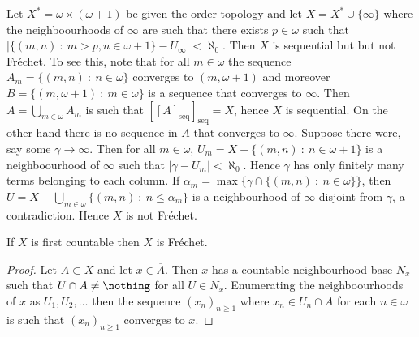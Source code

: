 \documentclass{article}
\newcommand{\seqcl}[1]{{[#1]_{\text{seq}}}}
\begin{document}
 
\begin{exam}
    Let \(X^{\ast} = \omega \times (\omega + 1)\) be given the order topology and let \(X =  X^{\ast} \cup \{\infty\}\) where the neighboourhoods  of \(\infty\) are such that there exists \(p \in \omega\) such that \(|\{(m, n) \: : \: m > p, n \in \omega + 1\} - U_{\infty}| < \aleph_0\). Then \(X\) is sequential but but not Fréchet. To see this, note that for all \(m \in \omega\) the sequence \(A_m = \{(m, n) \: : \: n \in \omega\}\) converges to \((m, \omega + 1)\) and moreover \(B = \{(m, \omega + 1) \: : \: m \in \omega\}\) is a sequence that converges to \(\infty\). Then \(A = \bigcup_{m \in \omega} A_m\) is such that \(\seqcl{\seqcl{A}} = X\), hence \(X\) is sequential. On the other hand there is no sequence in \(A\) that converges to \(\infty\). Suppose there were, say some \(\gamma \to \infty\). Then for all \(m \in \omega\), \(U_m = X - \{(m, n)\: : \: n \in \omega + 1\}\) is a neighboourhood of \(\infty\) such that \(|\gamma - U_m| < \aleph_0\). Hence \(\gamma\) has only finitely many terms belonging to each column. If \(\alpha_m = \max\{\gamma \cap \{(m, n) \: : \: n \in \omega\}\}\), then \(U = X - \bigcup_{m \in \omega} \{(m ,n )\: : \:  n \leq \alpha_m\}\) is a neighbourhood of \(\infty\) disjoint from \(\gamma\), a contradiction. Hence \(X\) is not Fréchet. 
\end{exam} 
\begin{prop}
    If \(X\) is first countable then \(X\) is Fréchet.
\end{prop}
\begin{proof}
    Let \(A \subset X\) and let \(x \in \overline{A}\). Then \(x\) has a countable neighbourhood base \(N_x\) such that \(U \cap A \neq \nothing\) for all \(U \in N_x\). Enumerating the neighboourhoods of \(x\) as \(U_1, U_2, \dots\) then the sequence \((x_n)_{n \ge 1}\) where \(x_n \in U_n \cap A\) for each \(n \in \omega\) is such that \((x_n)_{n \ge 1}\) converges to \(x\).
\end{proof}
\end{document}
